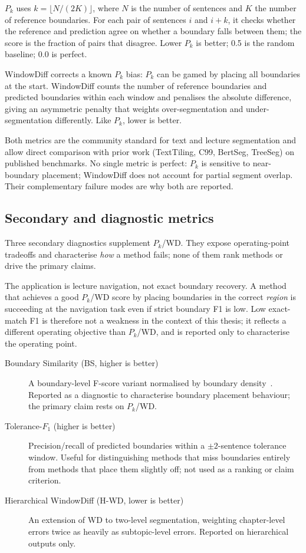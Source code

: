 $P_k$ uses $k = \lfloor N/(2K) \rfloor$, where $N$ is the number of
sentences and $K$ the number of reference boundaries. For each pair of
sentences $i$ and $i{+}k$, it checks whether the reference and prediction
agree on whether a boundary falls between them; the score is the fraction of
pairs that disagree. Lower $P_k$ is better; 0.5 is the random baseline;
0.0 is perfect.

WindowDiff \cite{pevzner2002critique} corrects a known $P_k$ bias: $P_k$
can be gamed by placing all boundaries at the start. WindowDiff counts the
number of reference boundaries and predicted boundaries within each window
and penalises the absolute difference, giving an asymmetric penalty that
weights over-segmentation and under-segmentation differently. Like $P_k$,
lower is better.

Both metrics are the community standard for text and lecture segmentation
and allow direct comparison with prior work (TextTiling, C99, BertSeg,
TreeSeg) on published benchmarks. No single metric is perfect: $P_k$ is
sensitive to near-boundary placement; WindowDiff does not account for partial
segment overlap. Their complementary failure modes are why both are reported.

\subsection{Secondary and diagnostic metrics}
\label{sec:secondary_metrics}

Three secondary diagnostics supplement $P_k$/WD.
They expose operating-point tradeoffs and characterise
\emph{how} a method fails; none of them rank methods or drive the primary claims.

The application is lecture navigation, not exact boundary recovery.
A method that achieves a good $P_k$/WD score by placing boundaries in the
correct \emph{region} is succeeding at the navigation task even if strict
boundary F1 is low.
Low exact-match F1 is therefore not a weakness in the context of this thesis;
it reflects a different operating objective than $P_k$/WD, and is reported
only to characterise the operating point.

\begin{description}
  \item[Boundary Similarity (BS, higher is better)] A boundary-level F-score
    variant normalised by boundary density~\cite{fournier2012}. Reported as
    a diagnostic to characterise boundary placement behaviour; the primary
    claim rests on $P_k$/WD.
  \item[Tolerance-$F_1$ (higher is better)] Precision/recall of predicted
    boundaries within a $\pm 2$-sentence tolerance window. Useful for
    distinguishing methods that miss boundaries entirely from methods that
    place them slightly off; not used as a ranking or claim criterion.
  \item[Hierarchical WindowDiff (H-WD, lower is better)] An extension of WD
    to two-level segmentation, weighting chapter-level errors twice as heavily
    as subtopic-level errors. Reported on hierarchical outputs only.
\end{description}

